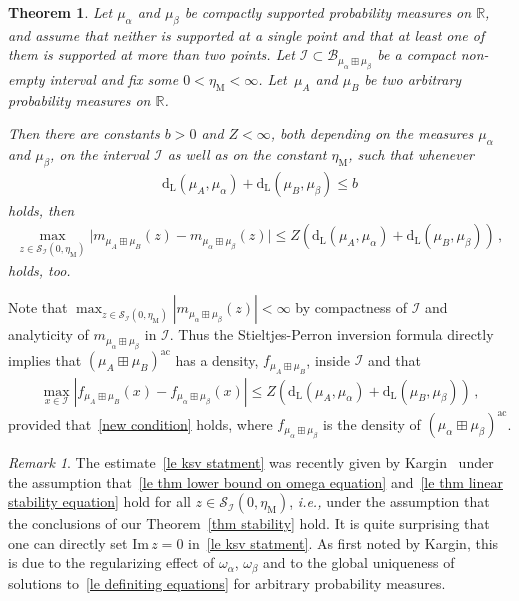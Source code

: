 \documentclass[10pt,reqno]{amsart}
\numberwithin{equation}{section}
\theoremstyle{plain}
\newtheorem{theorem}{Theorem}[section]
\newcounter{kevin}
\numberwithin{kevin}{section}
\theoremstyle{remark}
\newtheorem{remark}[kevin]{Remark}
\newcommand{\im}{\mathrm{Im}\,}
\newcommand{\R}{{\mathbb R }}
\newcommand{\ie}{\emph{i.e., }}
\newcommand{\dL}{\mathrm{d}_{\mathrm{L}}}
\begin{document}
\begin{theorem}\label{le theorem continuity}
Let $\mu_\alpha$ and $\mu_\beta$ be compactly supported probability measures on $\R$, and assume that neither is supported at a single point and that at least one of them is supported at more than two points. Let $\mathcal{I}\subset\mathcal{B}_{\mu_\alpha\boxplus\mu_\beta}$ be a compact non-empty interval and fix some $0<\eta_{\mathrm{M}}<\infty$. Let~$\mu_A$ and $\mu_B$ be two arbitrary probability measures on $\R$. 

Then there are constants $b>0$ and $Z<\infty$, both depending on the measures $\mu_\alpha$ and $\mu_\beta$, on the interval $\mathcal{I}$ as well as on the constant $\eta_{\mathrm{M}}$,  such that whenever
\begin{align}\label{new condition}
\dL(\mu_A,\mu_\alpha)+\dL(\mu_B,\mu_\beta)\le b
\end{align}
holds, then
\begin{align}\label{le ksv statment}
 \max_{z\in\mathcal{S}_{\mathcal{I}}(0,\eta_{\mathrm{M}})}\big|m_{\mu_A\boxplus \mu_B}(z)-m_{\mu_\alpha\boxplus\mu_\beta}(z)\big|\le Z\left(\dL(\mu_A,\mu_\alpha)+\dL(\mu_B,\mu_\beta)\right)\,,
\end{align}
holds, too.
\end{theorem}
Note that $\max_{z\in\mathcal{S}_{\mathcal{I}}(0,\eta_{\mathrm{M}})} |m_{\mu_\alpha\boxplus\mu_\beta}(z)|<\infty$ by compactness of $\mathcal{I}$ and analyticity of $m_{\mu_\alpha\boxplus\mu_\beta}$ in $\mathcal{I}$. Thus the Stieltjes-Perron inversion formula directly implies that $(\mu_{A}\boxplus\mu_{B})^{\mathrm{ac}}$ has a density, $f_{\mu_A\boxplus\mu_B}$, inside $\mathcal{I}$ and that
\begin{align}\label{le uniform pointwise}
 \max_{x\in\mathcal{I}}|f_{\mu_A\boxplus\mu_B}(x)-f_{\mu_\alpha\boxplus\mu_\beta}(x)|\le Z\left(\dL(\mu_A,\mu_\alpha)+\dL(\mu_B,\mu_\beta)\right)\,,
\end{align}
provided that~\eqref{new condition} holds, where $f_{\mu_\alpha\boxplus\mu_\beta}$ is the density of $(\mu_\alpha\boxplus\mu_\beta)^{\mathrm{ac}}$.


\begin{remark}
The estimate~\eqref{le ksv statment} was recently given by Kargin~\cite{Kargin2013} under the assumption that~\eqref{le thm lower bound on omega equation} and~\eqref{le thm linear stability equation} hold for all $z\in\mathcal{S}_{\mathcal{I}}(0,\eta_\mathrm{M})$, \ie under the assumption that the conclusions of our Theorem~\ref{thm stability} hold. It is quite surprising that one can directly set $\im z=0$ in~\eqref{le ksv statment}. As first noted by Kargin, this is due to the regularizing effect of $\omega_\alpha$, $\omega_\beta$ and to the global uniqueness of solutions to~\eqref{le definiting equations} for arbitrary probability measures.
\end{remark}
\end{document}
